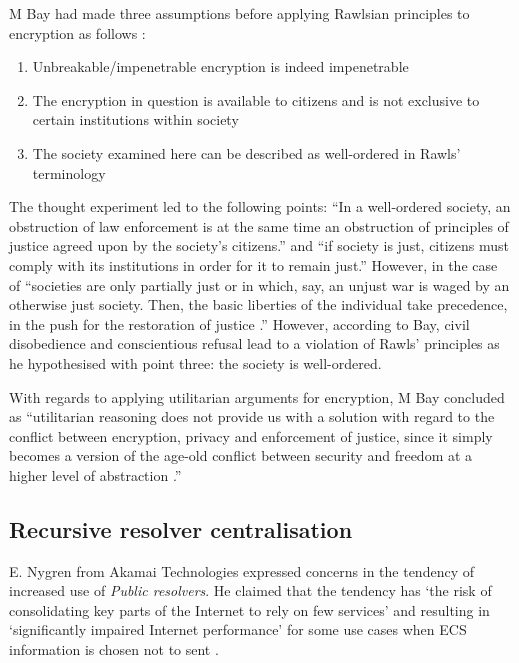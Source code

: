 M Bay had made three assumptions before applying Rawlsian principles to encryption as follows \cite{bay2017ethics}:
\begin{enumerate}
  \item Unbreakable/impenetrable encryption is indeed impenetrable
  \item The encryption in question is available to citizens and is not exclusive to certain institutions within society
  \item The society examined here can be described as well-ordered \cite{moon_2014, RawlsJohn1973Atoj} in Rawls’ terminology
\end{enumerate}
The thought experiment led to the following points: ``In a well-ordered society, an obstruction of law enforcement is at the same time an obstruction of principles of justice agreed upon by the society’s citizens.'' and  ``if society is just, citizens must comply with its institutions in order for it to remain just.''
However, in the case of ``societies are only partially just or in which, say, an unjust war is waged by an otherwise just society. Then, the basic liberties of the individual take precedence, in the push for the restoration of justice \cite{RawlsJohn1973Atoj}.''
However, according to Bay, civil disobedience and conscientious refusal lead to a violation of Rawls’ principles as he hypothesised with point three: the society is well-ordered.

With regards to applying utilitarian arguments for encryption, M Bay concluded as ``utilitarian reasoning does not provide us with a solution with regard to the conflict between encryption, privacy and enforcement of justice, since it simply becomes a version of the age-old conflict between security and freedom at a higher level of abstraction \cite{bay2017ethics}.''
\subsection{Recursive resolver centralisation}
E. Nygren from Akamai Technologies expressed concerns in the tendency of increased use of \textit{Public resolvers}.
He claimed that the tendency has `the risk of consolidating key parts of the Internet to rely on few services' and resulting in `significantly impaired Internet performance' for some use cases when ECS information is chosen not to sent \cite{akamai-dns-architecture}.

